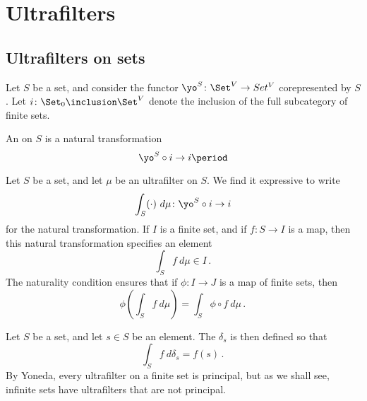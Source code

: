 
\section{Ultrafilters}%
\label{sec:ultrafilters}

\subsection{Ultrafilters on sets}%
\label{sub:ultrafilters_on_sets}

\begin{definition}%
	\label{dfn:ultrafilter}
	Let $ S $ be a set,
	and consider the functor
	$ \yo^S \colon \Set^V \to Set^V $
	corepresented by $ S $.
	Let $ i \colon \Set_0 \inclusion \Set^V $
	denote the inclusion of the full subcategory 
	of finite sets.

	An  on $ S $ is
	a natural transformation
	\[ \yo^S \circ i \to i \period \]
\end{definition}

\begin{notation}
	Let $ S $ be a set, and
	let $ \mu $ be an ultrafilter on $ S $.
	We find it expressive to write
	\[ \int_S (\cdot) \ d\mu \colon \yo^S \circ i \to i \]
	for the natural transformation.
	If $ I $ is a finite set,
	and if $ f \colon S \to I $ is a map,
	then this natural transformation
	specifies an element
	\[ \int_S f \ d\mu \in I \period \]
	The naturality condition ensures that
	if $ \phi \colon I \to J $ is a map of finite sets,
	then
	\[
		\phi \left( \int_S f \ d\mu \right) = 
		\int_S \phi \circ f \ d\mu \period
	\]
\end{notation}

\begin{eg}
	Let $ S $ be a set, and let $ s \in S $ be an element.
	The  $ \delta_s $ is then defined so that
	\[
		\int_S f \ d \delta_s = f(s) \period
	\]
	By Yoneda,
	every ultrafilter on a finite set is principal,
	but as we shall see,
	infinite sets have ultrafilters that are not principal.
\end{eg}

